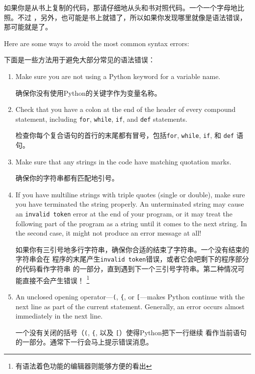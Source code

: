 \documentclass[10pt]{book}
\begin{document}
\begin{CJK}{UTF8}{gbsn}
如果你是从书上复制的代码，那请仔细地从头和书对照代码。一个一个字母地比照。不过
，另外，也可能是书上就错了，所以如果你发现哪里就像是语法错误，那可能就是了。

Here are some ways to avoid the most common syntax errors:

下面是一些方法用于避免大部分常见的语法错误：

\begin{enumerate}

\item Make sure you are not using a Python keyword for a variable name.

确保你没有使用Python的关键字作为变量名称。

\item Check that you have a colon at the end of the header of every
compound statement, including {\tt for}, {\tt while},
{\tt if}, and {\tt def} statements.

检查你每个复合语句的首行的末尾都有冒号，包括{\tt for}, {\tt while},
{\tt if}, 和 {\tt def} 语句。

\item Make sure that any strings in the code have matching
quotation marks.

确保你的字符串都有匹配地引号。

\item If you have multiline strings with triple quotes (single or double), make
sure you have terminated the string properly.  An unterminated string
may cause an {\tt invalid token} error at the end of your program,
or it may treat the following part of the program as a string until it
comes to the next string.  In the second case, it might not produce an error
message at all!

如果你有三引号地多行字符串，确保你合适的结束了字符串。一个没有结束的字符串会在
程序的末尾产生{\tt invalid token}错误，或者它会吧剩下的程序部分的代码看作字符串
的一部分，直到遇到下一个三引号字符串。第二种情况可能直接不会产生错误！
\footnote{有语法着色功能的编辑器则能够方便的看出}

\item An unclosed opening operator---\verb+(+, \verb+{+, or
  \verb+[+---makes Python continue with the next line as part of the
  current statement.  Generally, an error occurs almost immediately in
  the next line.

  一个没有关闭的括号（\verb+(+, \verb+{+, 以及 \verb+[+）使得Python把下一行继续
          看作当前语句的一部分。通常下一行会马上提示错误消息。


\end{enumerate}
\end{CJK}
\end{document}
